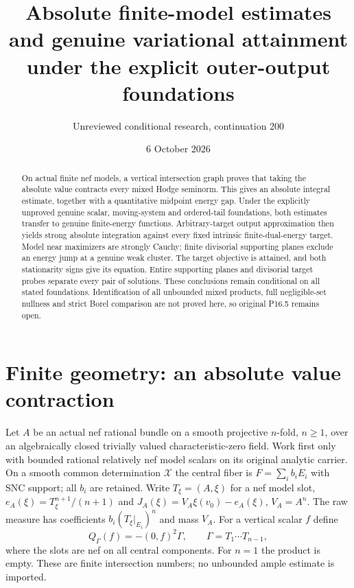 \documentclass[11pt]{article}
\title{Absolute finite-model estimates and genuine variational attainment\protect\\
under the explicit outer-output foundations}
\author{Unreviewed conditional research, continuation 200}
\date{6 October 2026}
\begin{document}
\maketitle
\begin{abstract}
On actual finite nef models, a vertical intersection graph proves
that taking the absolute value contracts every mixed Hodge seminorm.
This gives an absolute integral estimate, together with a quantitative
midpoint energy gap. Under the explicitly unproved genuine scalar,
moving-system and ordered-tail foundations, both estimates transfer
to genuine finite-energy functions. Arbitrary-target output
approximation then yields strong absolute integration against every
fixed intrinsic finite-dual-energy target. Model near maximizers are
strongly Cauchy; finite divisorial supporting planes exclude an energy
jump at a genuine weak cluster. The target objective is attained,
and both stationarity signs give its equation. Entire supporting
planes and divisorial target probes separate every pair of solutions.
These conclusions remain conditional on all stated foundations.
Identification of all unbounded mixed products, full negligible-set
nullness and strict Borel comparison are not proved here, so original
P16.5 remains open.
\end{abstract}

\section{Finite geometry: an absolute value contraction}
Let $A$ be an actual nef rational bundle on a smooth projective
$n$-fold, $n\geq1$, over an algebraically closed trivially valued
characteristic-zero field. Work first only with bounded rational
relatively nef model scalars on its original analytic carrier.
On a smooth common determination $\mathcal X$ the central fiber is
$F=\sum_i b_iE_i$ with SNC support; all $b_i$ are retained.
Write $T_\xi=(A,\xi)$ for a nef model slot,
$e_A(\xi)=T_\xi^{n+1}/(n+1)$ and
$J_A(\xi)=V_A\xi(v_0)-e_A(\xi)$, $V_A=A^n$.
The raw measure has coefficients $b_i(T_\xi|_{E_i})^n$ and mass
$V_A$. For a vertical scalar $f$ define
\[
 Q_\Gamma(f)=-(0,f)^2\Gamma,\qquad
 \Gamma=T_1\cdots T_{n-1},
\]
where the slots are nef on all central components.
For $n=1$ the product is empty. These are finite intersection
numbers; no unbounded ample estimate is imported.
\end{document}
